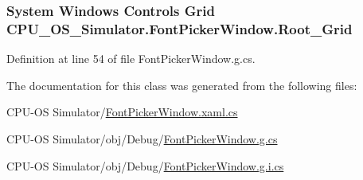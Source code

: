 \subsubsection[{Root\+\_\+\+Grid}]{\setlength{\rightskip}{0pt plus 5cm}System Windows Controls Grid C\+P\+U\+\_\+\+O\+S\+\_\+\+Simulator.\+Font\+Picker\+Window.\+Root\+\_\+\+Grid\hspace{0.3cm}{\ttfamily [package]}}\label{class_c_p_u___o_s___simulator_1_1_font_picker_window_a549891835e07203b79f3e81fb225c596}


Definition at line 54 of file Font\+Picker\+Window.\+g.\+cs.



The documentation for this class was generated from the following files\+:\begin{DoxyCompactItemize}
\item 
C\+P\+U-\/\+O\+S Simulator/\hyperlink{_font_picker_window_8xaml_8cs}{Font\+Picker\+Window.\+xaml.\+cs}\item 
C\+P\+U-\/\+O\+S Simulator/obj/\+Debug/\hyperlink{_font_picker_window_8g_8cs}{Font\+Picker\+Window.\+g.\+cs}\item 
C\+P\+U-\/\+O\+S Simulator/obj/\+Debug/\hyperlink{_font_picker_window_8g_8i_8cs}{Font\+Picker\+Window.\+g.\+i.\+cs}\end{DoxyCompactItemize}
